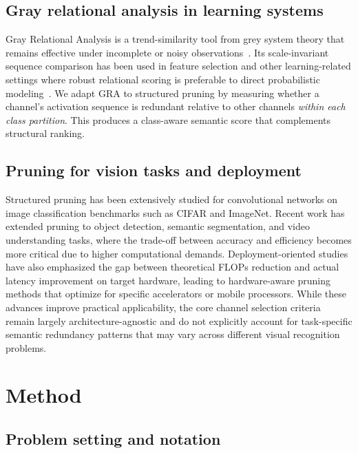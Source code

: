 \documentclass[preprint,12pt]{elsarticle}
\begin{document}
\subsection{Gray relational analysis in learning systems}

Gray Relational Analysis is a trend-similarity tool from grey system theory that remains effective under incomplete or noisy observations~\cite{deng1989gra,kuo2008use}. Its scale-invariant sequence comparison has been used in feature selection and other learning-related settings where robust relational scoring is preferable to direct probabilistic modeling~\cite{pal2021gra_histology}. We adapt GRA to structured pruning by measuring whether a channel's activation sequence is redundant relative to other channels \emph{within each class partition}. This produces a class-aware semantic score that complements structural ranking.

\subsection{Pruning for vision tasks and deployment}

Structured pruning has been extensively studied for convolutional networks on image classification benchmarks such as CIFAR and ImageNet. Recent work has extended pruning to object detection, semantic segmentation, and video understanding tasks, where the trade-off between accuracy and efficiency becomes more critical due to higher computational demands. Deployment-oriented studies have also emphasized the gap between theoretical FLOPs reduction and actual latency improvement on target hardware, leading to hardware-aware pruning methods that optimize for specific accelerators or mobile processors. While these advances improve practical applicability, the core channel selection criteria remain largely architecture-agnostic and do not explicitly account for task-specific semantic redundancy patterns that may vary across different visual recognition problems.

\section{Method}
\label{sec:method}

\subsection{Problem setting and notation}
\end{document}
